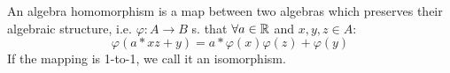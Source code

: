 \begin{definition}[Homomorphisms]
    An algebra homomorphism is a map between two algebras which preserves their algebraic structure, i.e. $\varphi: A \to B$ s. that $\forall a \in \mathbb{R}$ and $x, y, z \in A$:
    \[\varphi(a*xz+y) = a*\varphi(x)\varphi(z) + \varphi(y)\]
    If the mapping is 1-to-1, we call it an isomorphism.
\end{definition}
